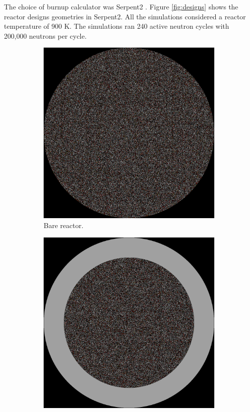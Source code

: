 \documentclass[11pt,letterpaper]{article}
\begin{document}
The choice of burnup calculator was Serpent2 \cite{leppanen_development_2007} \cite{leppanen_serpent_2015}.
Figure \ref{fig:designs} shows the reactor designs geometries in Serpent2.
All the simulations considered a reactor temperature of 900 K.
The simulations ran 240 active neutron cycles with 200,000 neutrons per cycle.

\begin{figure}[htbp!]
	\centering
	\begin{subfigure}[t]{0.4\textwidth}
		\centering
		\includegraphics[width=\linewidth]{figures/bare2_geom1.png}
		\caption{Bare reactor.}
	\end{subfigure}
	\begin{subfigure}[t]{0.4\textwidth}
		\centering
		\includegraphics[width=\linewidth]{figures/reflector2_geom1.png}

\end{subfigure}
\end{figure}
\end{document}
